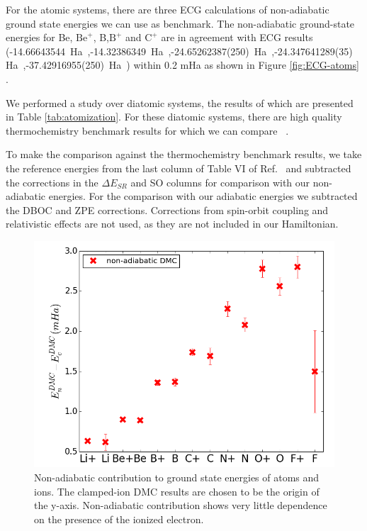 \documentclass[pra,superscriptaddress,groupedaddress,twocolumn]{revtex4}
\begin{document}
For the atomic systems, there are three ECG calculations of non-adiabatic ground state energies we can use as benchmark. The non-adiabatic ground-state energies for Be, $\text{Be}^+$, B,$\text{B}^+$ and $\text{C}^+$ are in agreement with ECG results (-14.66643544~Ha~\cite{Bubin_BeH_noBO},-14.32386349~Ha~\cite{Bubin_BeH_noBO},-24.65262387(250)~Ha~\cite{Bubin_B},-24.347641289(35)~Ha~\cite{Bubin_B+},-37.42916955(250)~Ha~\cite{Bubin_C+}) within 0.2 mHa as shown in Figure \ref{fig:ECG-atoms} .

We performed a study over diatomic systems, the results of which are presented in Table \ref{tab:atomization}. For these diatomic systems, there are high quality thermochemistry benchmark results for which we can compare ~\cite{Feller_Corrections}. 

To make the comparison against the thermochemistry benchmark results, we take the reference energies from the last column of Table VI of Ref.~\cite{Feller_Corrections} and subtracted the corrections in the $\Delta E_{SR}$ and SO columns for comparison with our non-adiabatic energies.  For the comparison with our adiabatic energies we subtracted the DBOC and ZPE corrections.  Corrections from spin-orbit coupling and relativistic effects are not used, as they are not included in our Hamiltonian.

\begin{figure}
\includegraphics[scale=.4]{Figures/atom-nad-ad}
\caption{Non-adiabatic contribution to ground state energies of atoms and ions. The clamped-ion DMC results are chosen to be the origin of the y-axis. Non-adiabatic contribution shows very little dependence on the presence of the ionized electron.}
\end{figure}
\end{document}
